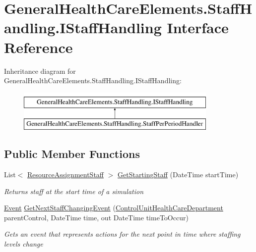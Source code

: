 \hypertarget{interface_general_health_care_elements_1_1_staff_handling_1_1_i_staff_handling}{}\section{General\+Health\+Care\+Elements.\+Staff\+Handling.\+I\+Staff\+Handling Interface Reference}
\label{interface_general_health_care_elements_1_1_staff_handling_1_1_i_staff_handling}
Inheritance diagram for General\+Health\+Care\+Elements.\+Staff\+Handling.\+I\+Staff\+Handling\+:\begin{figure}[H]
\begin{center}
\leavevmode
\includegraphics[height=2.000000cm]{interface_general_health_care_elements_1_1_staff_handling_1_1_i_staff_handling}
\end{center}
\end{figure}
\subsection*{Public Member Functions}
\begin{DoxyCompactItemize}
\item 
List$<$ \hyperlink{class_general_health_care_elements_1_1_resource_handling_1_1_resource_assignment_staff}{Resource\+Assignment\+Staff} $>$ \hyperlink{interface_general_health_care_elements_1_1_staff_handling_1_1_i_staff_handling_af7c2040a2394abc27c0314070eb9d47b}{Get\+Starting\+Staff} (Date\+Time start\+Time)
\begin{DoxyCompactList}\small\item\em Returns staff at the start time of a simulation \end{DoxyCompactList}\item 
\hyperlink{class_simulation_core_1_1_h_c_c_m_elements_1_1_event}{Event} \hyperlink{interface_general_health_care_elements_1_1_staff_handling_1_1_i_staff_handling_a671df823ef4e1dcc8bd3d90a4d0f175c}{Get\+Next\+Staff\+Changing\+Event} (\hyperlink{class_general_health_care_elements_1_1_control_units_1_1_control_unit_health_care_department}{Control\+Unit\+Health\+Care\+Department} parent\+Control, Date\+Time time, out Date\+Time time\+To\+Occur)
\begin{DoxyCompactList}\small\item\em Gets an event that represents actions for the next point in time where staffing levels change \end{DoxyCompactList}\end{DoxyCompactItemize}



